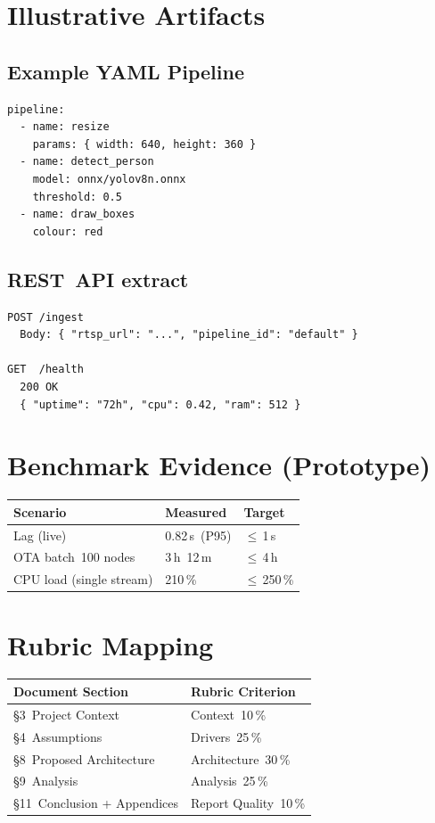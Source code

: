 \documentclass[11pt,a4paper]{article}
\begin{document}
\section{Illustrative Artifacts}

\subsection*{Example YAML Pipeline}
\begin{verbatim}
pipeline:
  - name: resize
    params: { width: 640, height: 360 }
  - name: detect_person
    model: onnx/yolov8n.onnx
    threshold: 0.5
  - name: draw_boxes
    colour: red
\end{verbatim}

\subsection*{REST API extract}
\begin{verbatim}
POST /ingest
  Body: { "rtsp_url": "...", "pipeline_id": "default" }

GET  /health
  200 OK
  { "uptime": "72h", "cpu": 0.42, "ram": 512 }
\end{verbatim}

\section{Benchmark Evidence (Prototype)}
\begin{tabular}{|p{4.2cm}|p{3cm}|p{3cm}|}
\hline
\textbf{Scenario} & \textbf{Measured} & \textbf{Target} \\ \hline
Lag (live) & 0.82 s (P95) & $\le$ 1 s \\ \hline
OTA batch 100 nodes & 3 h 12 m & $\le$ 4 h \\ \hline
CPU load (single stream) & 210 \% & $\le$ 250 \% \\ \hline
\end{tabular}

\section{Rubric Mapping}
\begin{tabular}{|p{4cm}|p{6cm}|}
\hline
\textbf{Document Section} & \textbf{Rubric Criterion} \\ \hline
§3 Project Context & Context 10 \% \\ \hline
§4 Assumptions & Drivers 25 \% \\ \hline
§8 Proposed Architecture & Architecture 30 \% \\ \hline
§9 Analysis & Analysis 25 \% \\ \hline
§11 Conclusion + Appendices & Report Quality 10 \% \\ \hline
\end{tabular}
\end{document}
